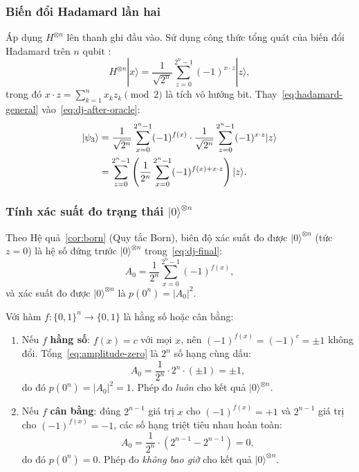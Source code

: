 \subsubsection*{Biến đổi Hadamard lần hai}
 
Áp dụng $H^{\otimes n}$ lên thanh ghi đầu vào. Sử dụng công thức tổng quát
của biến đổi Hadamard trên $n$ qubit \cite{ref5}:
\begin{equation}
    H^{\otimes n}|x\rangle
    = \frac{1}{\sqrt{2^n}}\sum_{z=0}^{2^n-1}(-1)^{x\cdot z}|z\rangle,
    \label{eq:hadamard-general}
\end{equation}
trong đó $x \cdot z = \sum_{k=1}^{n} x_k z_k \pmod{2}$ là tích vô hướng bit.
Thay~\eqref{eq:hadamard-general} vào~\eqref{eq:dj-after-oracle}:
\begin{align}
    |\psi_3\rangle
    &= \frac{1}{\sqrt{2^n}}\sum_{x=0}^{2^n-1}(-1)^{f(x)}
       \cdot\frac{1}{\sqrt{2^n}}\sum_{z=0}^{2^n-1}(-1)^{x\cdot z}|z\rangle
       \notag\\
    &= \sum_{z=0}^{2^n-1}
       \left(\frac{1}{2^n}\sum_{x=0}^{2^n-1}(-1)^{f(x)+x\cdot z}\right)|z\rangle.
    \label{eq:dj-final}
\end{align}
 
\subsubsection*{Tính xác suất đo trạng thái $|0\rangle^{\otimes n}$}
 
Theo Hệ quả~\ref{cor:born} (Quy tắc Born), biên độ xác suất đo được
$|0\rangle^{\otimes n}$ (tức $z = 0$) là hệ số đứng trước $|0\rangle^{\otimes n}$
trong~\eqref{eq:dj-final}:
\begin{equation}
    A_0 = \frac{1}{2^n}\sum_{x=0}^{2^n-1}(-1)^{f(x)},
    \label{eq:amplitude-zero}
\end{equation}
và xác suất đo được $|0\rangle^{\otimes n}$ là $p(0^n) = |A_0|^2$.
 
\begin{proposition}
\label{prop:dj-criterion}
Với hàm $f:\{0,1\}^n\to\{0,1\}$ là hằng số hoặc cân bằng:
\begin{enumerate}[label=(\roman*)]
    \item Nếu $f$ \textbf{hằng số}: $f(x) = c$ với mọi $x$, nên
          $(-1)^{f(x)} = (-1)^c = \pm 1$ không đổi. Tổng~\eqref{eq:amplitude-zero}
          là $2^n$ số hạng cùng dấu:
          $$A_0 = \frac{1}{2^n}\cdot 2^n\cdot(\pm 1) = \pm 1,$$
          do đó $p(0^n) = |A_0|^2 = 1$. Phép đo \emph{luôn} cho kết quả
          $|0\rangle^{\otimes n}$.
    \item Nếu $f$ \textbf{cân bằng}: đúng $2^{n-1}$ giá trị $x$ cho
          $(-1)^{f(x)} = +1$ và $2^{n-1}$ giá trị cho $(-1)^{f(x)} = -1$,
          các số hạng triệt tiêu nhau hoàn toàn:
          $$A_0 = \frac{1}{2^n}\cdot(2^{n-1} - 2^{n-1}) = 0,$$
          do đó $p(0^n) = 0$. Phép đo \emph{không bao giờ} cho kết quả
          $|0\rangle^{\otimes n}$.
\end{enumerate}
\end{proposition}
 
